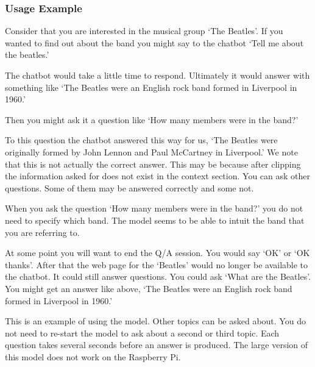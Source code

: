 \subsubsection{Usage Example}

Consider that you are interested in the musical group `The Beatles'. If you wanted to find out about the band you might say to the chatbot `Tell me about the beatles.'

The chatbot would take a little time to respond. Ultimately it would answer with something like `The Beatles were an English rock band formed in Liverpool in 1960.'

Then you might ask it a question like `How many members were in the band?'

To this question the chatbot answered this way for us, `The Beatles were originally formed by John Lennon and Paul McCartney in Liverpool.' We note that this is not actually the correct answer. This may be because after clipping the information asked for does not exist in the context section. You can ask other questions. Some of them may be answered correctly and some not. 

When you ask the question `How many members were in the band?' you do not need to specify which band. The model seems to be able to intuit the band that you are referring to.

At some point you will want to end the Q/A session. You would say `OK' or `OK thanks'. After that the web page for the `Beatles' would no longer be available to the chatbot. It could still answer questions. You could ask `What are the Beatles'. You might get an answer like above, `The Beatles were an English rock band formed in Liverpool in 1960.'

This is an example of using the model. Other topics can be asked about. You do not need to re-start the model to ask about a second or third topic. Each question takes several seconds before an answer is produced. The large version of this model does not work on the Raspberry Pi.